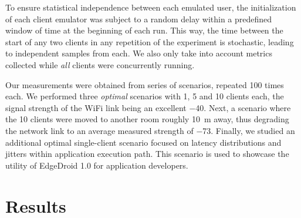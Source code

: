 To ensure statistical independence between each emulated user, the initialization of each client emulator was subject to a random delay within a predefined window of time at the beginning of each run.
This way, the time between the start of any two clients in any repetition of the experiment is stochastic, leading to independent samples from each.
We also only take into account metrics collected while \emph{all} clients were concurrently running.

Our measurements were obtained from series of scenarios, repeated 100 times each.
We performed three \emph{optimal} scenarios with 1, 5 and 10 clients each, the signal strength of the WiFi link being an excellent \SI{-40}{\dBm}.
Next, a scenario where the 10 clients were moved to another room roughly \SI{10}{\meter} away, thus degrading the network link to an average measured strength of \SI{-73}{\dBm}.
Finally, we studied an additional optimal single-client scenario focused on latency distributions and jitters within application execution path.
This scenario is used to showcase the utility of EdgeDroid 1.0 for application developers.

\section{Results}\label{sec:results}

